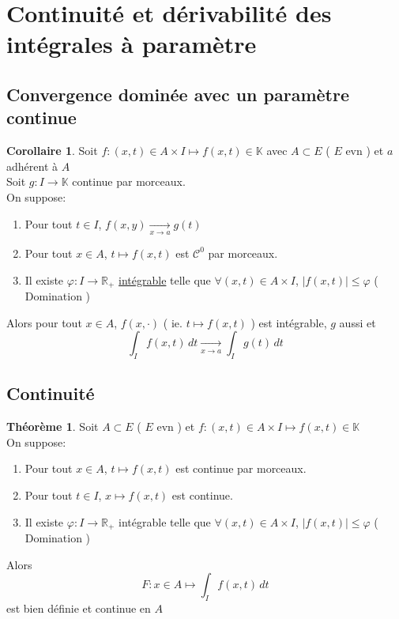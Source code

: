 \documentclass[10pt,a4paper]{article}
\theoremstyle{definition}
\newtheorem{theorem}[proposition]{Théorème}
\newtheorem{corollary}[proposition]{Corollaire}
\begin{document}
\section{Continuité et dérivabilité des intégrales à paramètre}
\subsection{Convergence dominée avec un paramètre continue}
\begin{corollary}
    Soit \(f:(x, t) \in A \times I \mapsto f(x, t) \in \mathbb{K}\) avec \(A \subset E\) ( \(E\) evn ) et \(a\) adhérent à \(A\) \\
    Soit \(g: I \to \mathbb{K}\) continue par morceaux. \\
    On suppose:
    \begin{enumerate}
        \item Pour tout \(t \in I\), \(f(x, y) \xrightarrow[x \to a]{}g(t)\)
        \item Pour tout \(x \in A\), \(t \mapsto f(x, t)\) est \(\mathcal{C}^0\) par morceaux.
        \item Il existe \(\varphi: I \to \mathbb{R}_+\) \uline{intégrable} telle que \(\forall (x, t) \in A \times I\), \(|f(x, t)| \leq \varphi\) ( Domination )
    \end{enumerate}
    Alors pour tout \(x \in A\), \(f(x, \cdot)\) ( ie. \(t \mapsto f(x, t)\) ) est intégrable, \(g\) aussi et
    \[\boxed{\int_{I} f(x, t) \,dt \xrightarrow[x \to a]{} \int_{I} g(t) \,dt}\]
\end{corollary}

\subsection{Continuité}
\begin{theorem}
    Soit \(A \subset E\) ( \(E\) evn ) et \(f: (x, t) \in A \times I \mapsto f(x, t) \in \mathbb{K}\) \\
    On suppose:
    \begin{enumerate}
        \item Pour tout \(x \in A\), \(t \mapsto f(x, t)\) est continue par morceaux.
        \item Pour tout \(t \in I\), \(x \mapsto f(x, t)\) est continue.
        \item Il existe \(\varphi: I \to \mathbb{R}_+\) intégrable telle que \(\forall (x, t) \in A \times I\), \(|f(x, t)| \leq \varphi\) ( Domination )
    \end{enumerate}
    Alors \[F: x \in A \mapsto \int_{I} f(x, t) \,dt\] est bien définie et continue en \(A\)
\end{theorem}
\end{document}
